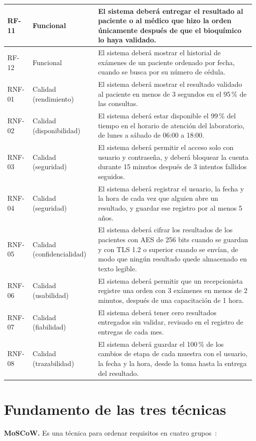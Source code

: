 \documentclass[11pt,a4paper]{article}
\begin{document}
\begin{longtable}{|L{1.5cm}|L{2.6cm}|L{11.0cm}|}
\hline
RF-11 & Funcional & El sistema deberá entregar el resultado al paciente o al médico que hizo la orden únicamente después de que el bioquímico lo haya validado.\\
\hline
RF-12 & Funcional & El sistema deberá mostrar el historial de exámenes de un paciente ordenado por fecha, cuando se busca por su número de cédula.\\
\hline
RNF-01 & Calidad (rendimiento) & El sistema deberá mostrar el resultado validado al paciente en menos de 3 segundos en el 95\,\% de las consultas.\\
\hline
RNF-02 & Calidad (disponibilidad) & El sistema deberá estar disponible el 99\,\% del tiempo en el horario de atención del laboratorio, de lunes a sábado de 06:00 a 18:00.\\
\hline
RNF-03 & Calidad (seguridad) & El sistema deberá permitir el acceso solo con usuario y contraseña, y deberá bloquear la cuenta durante 15 minutos después de 3 intentos fallidos seguidos.\\
\hline
RNF-04 & Calidad (seguridad) & El sistema deberá registrar el usuario, la fecha y la hora de cada vez que alguien abre un resultado, y guardar ese registro por al menos 5 años.\\
\hline
RNF-05 & Calidad (confidencialidad) & El sistema deberá cifrar los resultados de los pacientes con AES de 256 bits cuando se guardan y con TLS 1.2 o superior cuando se envían, de modo que ningún resultado quede almacenado en texto legible.\\
\hline
RNF-06 & Calidad (usabilidad) & El sistema deberá permitir que un recepcionista registre una orden con 3 exámenes en menos de 2 minutos, después de una capacitación de 1 hora.\\
\hline
RNF-07 & Calidad (fiabilidad) & El sistema deberá tener cero resultados entregados sin validar, revisado en el registro de entregas de cada mes.\\
\hline
RNF-08 & Calidad (trazabilidad) & El sistema deberá guardar el 100\,\% de los cambios de etapa de cada muestra con el usuario, la fecha y la hora, desde la toma hasta la entrega del resultado.\\
\hline
\end{longtable}

\section{Fundamento de las tres técnicas}
\textbf{MoSCoW.} Es una técnica para ordenar requisitos en cuatro grupos~\cite{pohl2025,ireb2026}:
\end{document}
